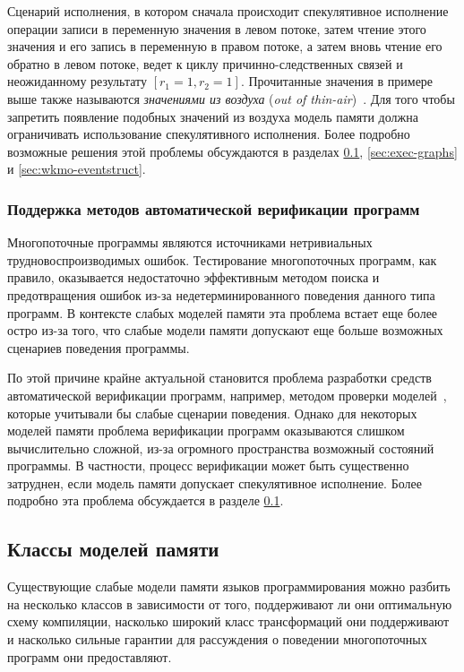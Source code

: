 \bigskip

Сценарий исполнения, в котором сначала происходит 
спекулятивное исполнение операции записи 
в переменную  значения  в левом потоке, 
затем чтение этого значения и его запись в переменную 
в правом потоке, а затем вновь чтение его обратно в левом потоке, 
ведет к циклу причинно-следственных связей 
и неожиданному результату ${[r_1=1, r_2=1]}$.
Прочитанные значения  в примере выше 
также называются \emph{значениями из воздуха} 
(\emph{out of thin-air})~\cite{Batty-al:ESOP15}.
Для того чтобы запретить появление подобных значений 
из воздуха модель памяти должна ограничивать использование
спекулятивного исполнения. 
Более подробно возможные решения этой проблемы 
обсуждаются в разделах \ref{sec:models-classes}, 
\ref{sec:exec-graphs} и \ref{sec:wkmo-eventstruct}.

\subsubsection*{Поддержка методов автоматической верификации программ}

Многопоточные программы являются источниками нетривиальных
трудновоспроизводимых ошибок. 
Тестирование многопоточных программ, как правило, 
оказывается недостаточно эффективным методом поиска 
и предотвращения ошибок из-за недетерминированного 
поведения данного типа программ.
В контексте слабых моделей памяти эта проблема встает еще более остро 
из-за того, что слабые модели памяти допускают еще больше 
возможных сценариев поведения программы. 

По этой причине крайне актуальной становится проблема
разработки средств автоматической верификации программ, 
например, методом проверки моделей~\cite{Baier:2008},
которые учитывали бы слабые сценарии поведения.
Однако для некоторых моделей памяти проблема верификации 
программ оказываются слишком вычислительно сложной, 
из-за огромного пространства возможный состояний программы. 
В частности, процесс верификации может быть существенно затруднен, 
если модель памяти допускает спекулятивное исполнение.
Более подробно эта проблема обсуждается в разделе \ref{sec:models-classes}.  

\subsection{Классы моделей памяти}
\label{sec:models-classes}

Существующие слабые модели памяти языков программирования 
можно разбить на несколько классов в зависимости от того, 
поддерживают ли они оптимальную схему компиляции, 
насколько широкий класс трансформаций они поддерживают 
и насколько сильные гарантии для рассуждения о поведении многопоточных программ
они предоставляют. 

